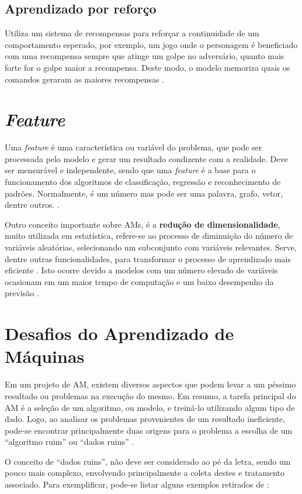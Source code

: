 \subsection{Aprendizado por reforço}
Utiliza um sistema de recompensas para reforçar a continuidade de um comportamento esperado, por exemplo, um jogo onde o personagem é beneficiado com uma recompensa sempre que atinge um golpe no adversário, quanto mais forte for o golpe maior a recompensa. Deste modo, o modelo memoriza quais os comandos geraram as maiores recompensas \cite{kirk2014thoughtful}.

\section{\textit{Feature}} 
Uma \textit{feature} é uma característica ou variável do problema, que pode ser processada pelo modelo e gerar um resultado condizente com a realidade. Deve ser mensurável e independente, sendo que uma \textit{feature} é a base para o funcionamento dos algoritmos de classificação, regressão e reconhecimento de padrões. Normalmente, é um número mas pode ser uma palavra, grafo, vetor, dentre outros. \cite{chandrashekar2014survey}.

Outro conceito importante sobre AMs, é a \textbf{redução de dimensionalidade}, muito utilizada em estatística, refere-se ao processo de diminuição do número de variáveis aleatórias, selecionando um subconjunto com variáveis relevantes. Serve, dentre outras funcionalidades, para transformar o processo de aprendizado mais eficiente \cite{borges2006reduccao}. Isto ocorre devido a modelos com um número elevado de variáveis ocasionam em um maior tempo de computação e um baixo desempenho da previsão \cite{chandrashekar2014survey}.

\section{Desafios do Aprendizado de Máquinas}
Em um projeto de AM, existem diversos aspectos que podem levar a um péssimo resultado ou problemas na execução do mesmo. Em resumo, a tarefa principal do AM é a seleção de um algoritmo, ou modelo, e treiná-lo utilizando algum tipo de dado. Logo, ao analisar os problemas provenientes de um resultado ineficiente, pode-se encontrar principalmente duas origens para o problema a escolha de um “algoritmo ruim” ou “dados ruins” \cite{geron2017hands}.

O conceito de “dados ruins”, não deve ser considerado ao pé da letra, sendo um pouco mais complexo, envolvendo principalmente a coleta destes e tratamento associado. Para exemplificar,  pode-se listar alguns exemplos retirados de :


